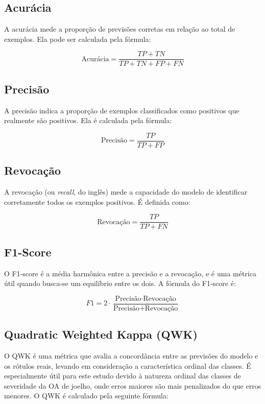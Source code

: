 \subsection{Acurácia}
A acurácia mede a proporção de previsões corretas em relação ao total de exemplos. Ela pode ser calculada pela fórmula:

\begin{equation}
    \text{Acurácia} = \frac{TP + TN}{TP + TN + FP + FN}
\end{equation}

\subsection{Precisão}
A precisão indica a proporção de exemplos classificados como positivos que realmente são positivos. Ela é calculada pela fórmula:

\begin{equation}
    \text{Precisão} = \frac{TP}{TP + FP}
\end{equation}

\subsection{Revocação}
A revocação (ou \textit{recall}, do inglês) mede a capacidade do modelo de identificar corretamente todos os exemplos positivos. É definida como:

\begin{equation}
    \text{Revocação} = \frac{TP}{TP + FN}
\end{equation}

\subsection{F1-Score}
O F1-score é a média harmônica entre a precisão e a revocação, e é uma métrica útil quando busca-se um equilíbrio entre os dois. A fórmula do F1-score é:

\begin{equation}
    F1 = 2 \cdot \frac{\text{Precisão} \cdot \text{Revocação}}{\text{Precisão} + \text{Revocação}}
\end{equation}

\subsection{Quadratic Weighted Kappa (QWK)}
O QWK é uma métrica que avalia a concordância entre as previsões do modelo e os rótulos reais, levando em consideração a característica ordinal das classes. É especialmente útil para este estudo devido à natureza ordinal das classes de severidade da OA de joelho, onde erros maiores são mais penalizados do que erros menores. O QWK é calculado pela seguinte fórmula:

